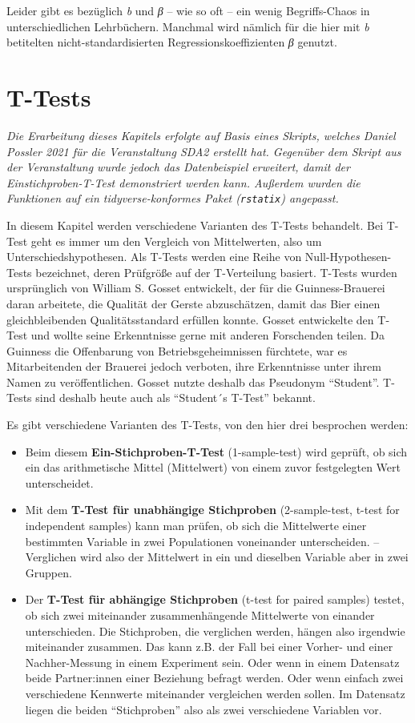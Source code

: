 \documentclass[
]{book}
\begin{document}
Leider gibt es bezüglich \emph{b} und \emph{β} -- wie so oft -- ein wenig Begriffs-Chaos in unterschiedlichen Lehrbüchern. Manchmal wird nämlich für die hier mit \emph{b} betitelten nicht-standardisierten Regressionskoeffizienten \emph{β} genutzt.

\hypertarget{t-tests}{%
\chapter{T-Tests}\label{t-tests}}

\emph{Die Erarbeitung dieses Kapitels erfolgte auf Basis eines Skripts, welches Daniel Possler 2021 für die Veranstaltung SDA2 erstellt hat. Gegenüber dem Skript aus der Veranstaltung wurde jedoch das Datenbeispiel erweitert, damit der Einstichproben-T-Test demonstriert werden kann. Außerdem wurden die Funktionen auf ein tidyverse-konformes Paket (\texttt{rstatix}) angepasst.}

In diesem Kapitel werden verschiedene Varianten des T-Tests behandelt. Bei T-Test geht es immer um den Vergleich von Mittelwerten, also um Unterschiedshypothesen.
Als T-Tests werden eine Reihe von Null-Hypothesen-Tests bezeichnet, deren Prüfgröße auf der T-Verteilung basiert.
T-Tests wurden ursprünglich von William S. Gosset entwickelt, der für die Guinness-Brauerei daran arbeitete, die Qualität der Gerste abzuschätzen, damit das Bier einen gleichbleibenden Qualitätsstandard erfüllen konnte.
Gosset entwickelte den T-Test und wollte seine Erkenntnisse gerne mit anderen Forschenden teilen.
Da Guinness die Offenbarung von Betriebsgeheimnissen fürchtete, war es Mitarbeitenden der Brauerei jedoch verboten, ihre Erkenntnisse unter ihrem Namen zu veröffentlichen.
Gosset nutzte deshalb das Pseudonym ``Student''.
T-Tests sind deshalb heute auch als ``Student´s T-Test'' bekannt.

Es gibt verschiedene Varianten des T-Tests, von den hier drei besprochen werden:

\begin{itemize}
\item
  Beim diesem \textbf{Ein-Stichproben-T-Test} (1-sample-test) wird geprüft, ob sich ein das arithmetische Mittel (Mittelwert) von einem zuvor festgelegten Wert unterscheidet.
\item
  Mit dem \textbf{T-Test für unabhängige Stichproben} (2-sample-test, t-test for independent samples) kann man prüfen, ob sich die Mittelwerte einer bestimmten Variable in zwei Populationen voneinander unterscheiden. -- Verglichen wird also der Mittelwert in ein und dieselben Variable aber in zwei Gruppen.
\item
  Der \textbf{T-Test für abhängige Stichproben} (t-test for paired samples) testet, ob sich zwei miteinander zusammenhängende Mittelwerte von einander unterschieden. Die Stichproben, die verglichen werden, hängen also irgendwie miteinander zusammen. Das kann z.B. der Fall bei einer Vorher- und einer Nachher-Messung in einem Experiment sein. Oder wenn in einem Datensatz beide Partner:innen einer Beziehung befragt werden. Oder wenn einfach zwei verschiedene Kennwerte miteinander vergleichen werden sollen. Im Datensatz liegen die beiden ``Stichproben'' also als zwei verschiedene Variablen vor.
\end{itemize}
\end{document}
